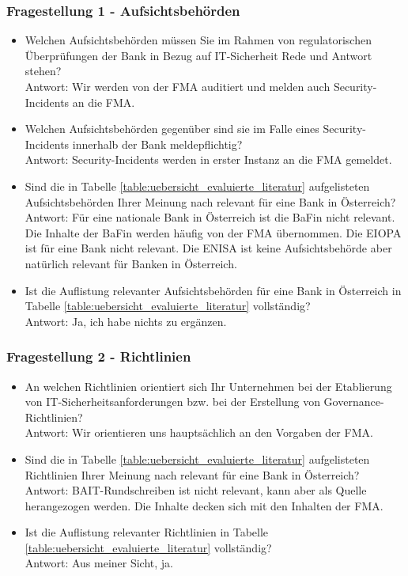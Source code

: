 \subsubsection{Fragestellung 1 - Aufsichtsbehörden}
\begin{itemize}
    \item Welchen Aufsichtsbehörden müssen Sie im Rahmen von regulatorischen Überprüfungen der Bank in Bezug auf IT-Sicherheit Rede und Antwort stehen?\\
    Antwort: Wir werden von der FMA auditiert und melden auch Security-Incidents an die FMA.\\
    \item Welchen Aufsichtsbehörden gegenüber sind sie im Falle eines Security-Incidents innerhalb der Bank meldepflichtig?\\
    Antwort: Security-Incidents werden in erster Instanz an die FMA gemeldet.\\
    \item Sind die in Tabelle \ref{table:uebersicht_evaluierte_literatur} aufgelisteten Aufsichtsbehörden Ihrer Meinung nach relevant für eine Bank in Österreich?\\
    Antwort: Für eine nationale Bank in Österreich ist die BaFin nicht relevant. Die Inhalte der BaFin werden häufig von der FMA übernommen. Die EIOPA ist für eine Bank nicht relevant. Die ENISA ist keine Aufsichtsbehörde aber natürlich relevant für Banken in Österreich.\\
    \item Ist die Auflistung relevanter Aufsichtsbehörden für eine Bank in Österreich in Tabelle \ref{table:uebersicht_evaluierte_literatur} vollständig?\\
    Antwort: Ja, ich habe nichts zu ergänzen.\\
\end{itemize}
\subsubsection{Fragestellung 2 - Richtlinien}
\begin{itemize}
    \item An welchen Richtlinien orientiert sich Ihr Unternehmen bei der Etablierung von IT-Sicherheitsanforderungen bzw. bei der Erstellung von Governance-Richtlinien?\\
    Antwort: Wir orientieren uns hauptsächlich an den Vorgaben der FMA.\\
    \item Sind die in Tabelle \ref{table:uebersicht_evaluierte_literatur} aufgelisteten Richtlinien Ihrer Meinung nach relevant für eine Bank in Österreich?\\
    Antwort: BAIT-Rundschreiben ist nicht relevant, kann aber als Quelle herangezogen werden. Die Inhalte decken sich mit den Inhalten der FMA.\\
    \item Ist die Auflistung relevanter Richtlinien in Tabelle \ref{table:uebersicht_evaluierte_literatur} vollständig?\\
    Antwort: Aus meiner Sicht, ja.\\
\end{itemize}
\bigbreak
